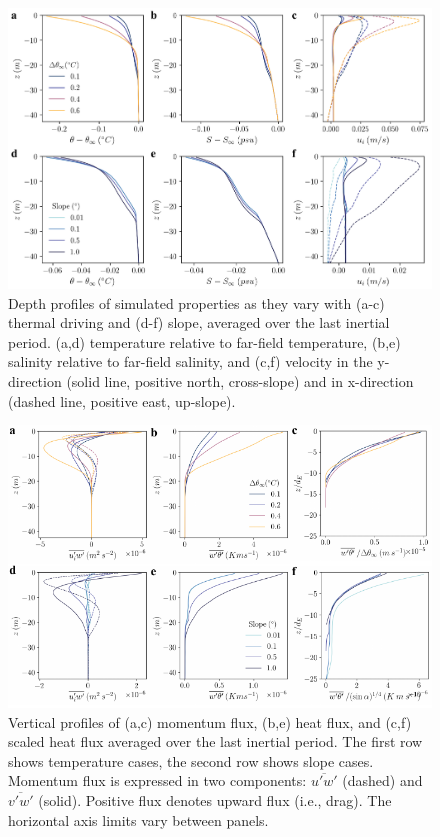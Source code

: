 \documentclass[tc, manuscript]{copernicus}
\begin{document}
\begin{figure}[t]
\includegraphics[width=12cm]{fig2.pdf}
\caption{Depth profiles of simulated properties as they vary with (a-c) thermal driving and (d-f) slope, averaged over the last inertial period. (a,d) temperature relative to far-field temperature, (b,e) salinity relative to far-field salinity, and (c,f) velocity in the y-direction (solid line, positive north, cross-slope) and in x-direction (dashed line, positive east, up-slope). }
\label{fig:dT_profiles}
\end{figure}

\begin{figure}[t]
\includegraphics[width=12cm]{fig3.pdf}
\caption{Vertical profiles of (a,c) momentum flux, (b,e) heat flux, and (c,f) scaled heat flux averaged over the last inertial period. The first row shows temperature cases, the second row shows slope cases. Momentum flux is expressed in two components:  $\overline{u'w'}$ (dashed) and $\overline{v'w'}$ (solid). Positive flux denotes upward flux (i.e., drag). The horizontal axis limits vary between panels.}
\label{fig:flux_profiles}
\end{figure}
\end{document}
